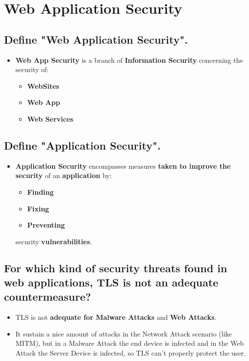 \documentclass[9pt, letterpaper]{article}
\begin{document}
\newpage

\section{Web Application Security}

\subsection{Define "Web Application Security".}
\begin{itemize}
	\item \textbf{Web App Security} is a branch of \textbf{Information Security} concerning the security of:
	\begin{itemize}
		\item \textbf{WebSites}
		\item \textbf{Web App}
		\item \textbf{Web Services}
	\end{itemize}
\end{itemize}

\subsection{Define "Application Security".}
\begin{itemize}
	\item \textbf{Application Security} encompasses measures \textbf{taken to improve the security} of an \textbf{application} by:
	\begin{itemize}
		\item \textbf{Finding}
		\item \textbf{Fixing}
		\item \textbf{Preventing}
	\end{itemize}
	security \textbf{vulnerabilities}.
\end{itemize}

\subsection{For which kind of security threats found in web applications, TLS is not an adequate countermeasure?}
\begin{itemize}
	\item TLS is not \textbf{adequate for Malware Attacks} and \textbf{Web Attacks}. 
	\item It sustain a nice amount of attacks in the Network Attack scenario (like MITM), but in a Malware Attack the end device is infected and in the Web Attack the Server Device is infected, so TLS can't properly protect the user.
\end{itemize}
\end{document}
